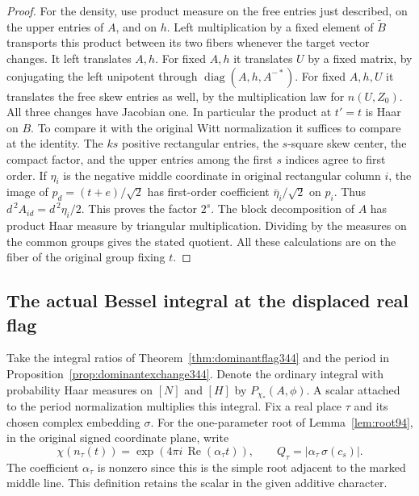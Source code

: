 \documentclass[a4paper,11pt]{article}
\theoremstyle{definition}
\theoremstyle{remark}
\numberwithin{equation}{section}
\begin{document}
\begin{proof}
For the density, use product measure on the free entries just
described, on the upper entries of \(A\), and on \(h\).
Left multiplication by a fixed element of \(\widetilde B\)
transports this product between its two fibers whenever the
target vector changes. It left translates \(A,h\). For fixed
\(A,h\) it translates \(U\) by a fixed matrix, by conjugating
the left unipotent through \(\operatorname{diag}(A,h,A^{-*})\).
For fixed \(A,h,U\) it translates the free skew entries as well,
by the multiplication law for \(n(U,Z_0)\). All three changes
have Jacobian one. In particular the product at \(t'=t\) is
Haar on \(B\). To compare it with the original Witt normalization
it suffices to compare at the identity. The \(ks\) positive
rectangular entries, the \(s\)-square skew center, the compact
factor, and the upper entries among the first \(s\) indices
agree to first order. If \(\eta_i\) is the negative middle
coordinate in original rectangular column \(i\), the image of
\(p_d=(t+e)/\sqrt2\) has first-order coefficient
\(\bar\eta_i/\sqrt2\) on \(p_i\). Thus
\(d^{\,2}A_{id}=d^{\,2}\eta_i/2\). This proves the factor
\(2^s\). The block decomposition of \(A\) has product Haar
measure by triangular multiplication. Dividing by the measures
on the common groups gives the stated quotient. All these
calculations are on the fiber of the original group fixing \(t\).
\end{proof}

\subsection{The actual Bessel integral at the displaced real flag}\label{sec:displacedreal344}
Take the integral ratios of Theorem~\ref{thm:dominantflag344} and
the period in Proposition~\ref{prop:dominantexchange344}. Denote
the ordinary integral with probability Haar measures on $[N]$ and
$[H]$ by $P_{\chi_*}(A,\phi)$. A scalar attached to the period
normalization multiplies this integral. Fix a real place $\tau$
and its chosen complex embedding $\sigma$. For the one-parameter
root of Lemma~\ref{lem:root94}, in the original signed coordinate
plane, write
\[
       \chi(n_\tau(t))=\exp(4\pi i\,\operatorname{Re}(\alpha_\tau t)),
          \qquad Q_\tau=|\alpha_\tau\,\sigma(c_s)|.
\]
The coefficient $\alpha_\tau$ is nonzero since this is the simple
root adjacent to the marked middle line. This definition retains
the scalar in the given additive character.
\end{document}
